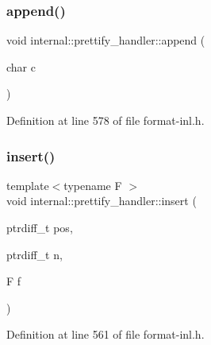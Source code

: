\mbox{\label{structinternal_1_1prettify__handler_a6257058c6ebf0a11075ca4009926af78}} 
\subsubsection{\texorpdfstring{append()}{append()}\hspace{0.1cm}{\footnotesize\ttfamily [2/2]}}
{\footnotesize\ttfamily void internal\+::prettify\+\_\+handler\+::append (\begin{DoxyParamCaption}\item[{char}]{c }\end{DoxyParamCaption})\hspace{0.3cm}{\ttfamily [inline]}}



Definition at line 578 of file format-\/inl.\+h.

\mbox{\label{structinternal_1_1prettify__handler_aefa1e7bbf120e18221a97a51c6b2048a}} 
\subsubsection{\texorpdfstring{insert()}{insert()}\hspace{0.1cm}{\footnotesize\ttfamily [1/2]}}
{\footnotesize\ttfamily template$<$typename F $>$ \\
void internal\+::prettify\+\_\+handler\+::insert (\begin{DoxyParamCaption}\item[{ptrdiff\+\_\+t}]{pos,  }\item[{ptrdiff\+\_\+t}]{n,  }\item[{F}]{f }\end{DoxyParamCaption})\hspace{0.3cm}{\ttfamily [inline]}}



Definition at line 561 of file format-\/inl.\+h.

